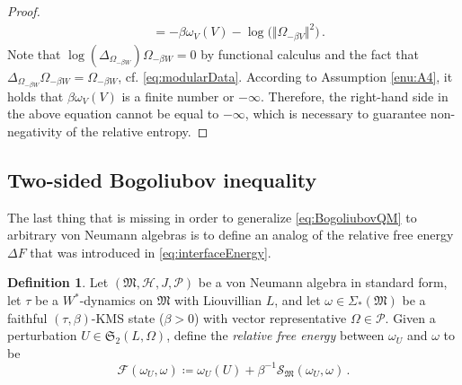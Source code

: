 \documentclass[a4paper, twoside, 11pt, reqno]{amsart}
\theoremstyle{definition}
\newtheorem{definition}{Definition}[section]
\theoremstyle{plain}
\renewcommand{\Delta}{\varDelta}
\renewcommand{\Sigma}{\varSigma}
\renewcommand{\Omega}{\varOmega}
\newcommand{\MF}{\mathcal{F}}
\newcommand{\MH}{\mathcal{H}}
\newcommand{\MS}{\mathcal{S}}
\newcommand{\MFM}{\mathfrak{M}}
\newcommand{\MFS}{\mathfrak{S}}
\newcommand{\NS}[1]{\Sigma_{\ast}(#1)}
\newcommand{\NPC}{\mathcal{P}}
\newcommand{\1}{\mathbf{1}}
\newcommand{\norm}[2][]{#1\Vert{#2}#1\Vert}
\newcommand{\ce}{\coloneqq}
\newcommand{\inv}[1]{#1^{-1}}
\begin{document}
\begin{proof}
\begin{align*}
        &= - \beta \omega_V (V) - \log \bigl(\norm{\Omega_{- \beta V}}^2\bigr) \, .
    \end{align*}
    Note that $\log(\Delta_{\Omega_{- \beta W}}) \Omega_{- \beta W} = 0$ by functional calculus and the fact that $\Delta_{\Omega_{- \beta W}} \Omega_{- \beta W} = \Omega_{- \beta W}$, cf. \cref{eq:modularData}. According to Assumption \ref{enu:A4}, it holds that $\beta \omega_V(V)$ is a finite number or $- \infty$. Therefore, the right-hand side in the above equation cannot be equal to $- \infty$, which is necessary to guarantee non-negativity of the relative entropy.
\end{proof}


\subsection{Two-sided Bogoliubov inequality}\label{subsec:twoSidedBogoliubov}

The last thing that is missing in order to generalize \cref{eq:BogoliubovQM} to arbitrary von Neumann algebras is to define an analog of the relative free energy $\Delta F$ that was introduced in \cref{eq:interfaceEnergy}.

\begin{definition}\label{def:relativeFreeEnergy}
    Let $(\MFM, \MH, J, \NPC)$ be a von Neumann algebra in standard form, let $\tau$ be a $W^\ast$-dynamics on $\MFM$ with Liouvillian $L$, and let $\omega \in \NS{\MFM}$ be a faithful $(\tau, \beta)$-KMS state ($\beta > 0$) with vector representative $\Omega \in \NPC$. Given a perturbation $U \in \MFS_2(L, \Omega)$, define the \emph{relative free energy} between $\omega_U$ and $\omega$ to be
    \begin{equation}\label{eq:relativeFreeEnergy}
        \MF(\omega_U, \omega) \ce \omega_U(U) + \inv{\beta} \MS_\MFM(\omega_U, \omega) \, .
    \end{equation}
\end{definition}
\end{document}
